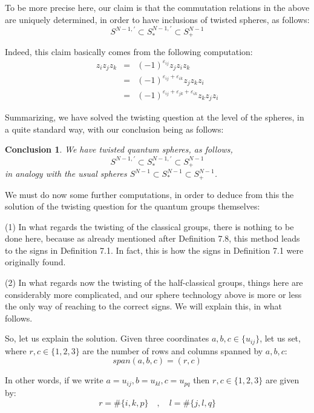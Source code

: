 \documentclass[12pt]{amsbook}
\newtheorem{conclusion}[theorem]{Conclusion}
\begin{document}
To be more precise here, our claim is that the commutation relations in the above are uniquely determined, in order to have inclusions of twisted spheres, as follows:
$$S^{N-1,\prime}\subset S^{N-1,\prime}_*\subset S^{N-1}_+$$

Indeed, this claim basically comes from the following computation:
\begin{eqnarray*}
z_iz_jz_k
&=&(-1)^{\varepsilon_{ij}}z_jz_iz_k\\
&=&(-1)^{\varepsilon_{ij}+\varepsilon_{ik}}z_jz_kz_i\\
&=&(-1)^{\varepsilon_{ij}+\varepsilon_{jk}+\varepsilon_{ik}}z_kz_jz_i
\end{eqnarray*}

Summarizing, we have solved the twisting question at the level of the spheres, in a quite standard way, with our conclusion being as follows:

\begin{conclusion}
We have twisted quantum spheres, as follows,
$$S^{N-1,\prime}\subset S^{N-1,\prime}_*\subset S^{N-1}_+$$
in analogy with the usual spheres $S^{N-1}\subset S^{N-1}_*\subset S^{N-1}_+$.
\end{conclusion}

We must do now some further computations, in order to deduce from this the solution of the twisting question for the quantum groups themselves:

\bigskip

(1) In what regards the twisting of the classical groups, there is nothing to be done here, because as already mentioned after Definition 7.8, this method leads to the signs in Definition 7.1. In fact, this is how the signs in Definition 7.1 were originally found.

\bigskip

(2) In what regards now the twisting of the half-classical groups, things here are considerably more complicated, and our sphere technology above is more or less the only way of reaching to the correct signs. We will explain this, in what follows.

\bigskip

So, let us explain the solution. Given three coordinates $a,b,c\in\{u_{ij}\}$, let us set, where $r,c\in\{1,2,3\}$ are the number of rows and columns spanned by $a,b,c$:
$$span(a,b,c)=(r,c)$$

In other words, if we write $a=u_{ij},b=u_{kl},c=u_{pq}$ then $r,c\in\{1,2,3\}$ are given by:
$$r=\#\{i,k,p\}\quad,\quad l=\#\{j,l,q\}$$
\end{document}
